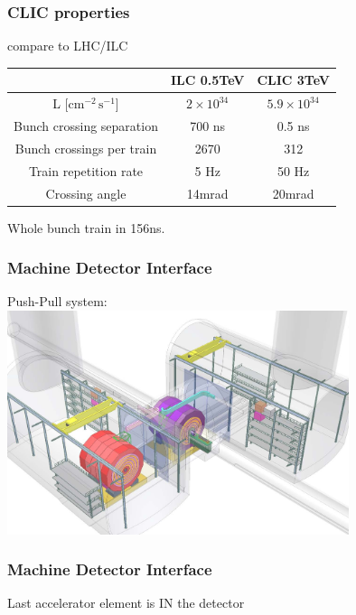 \documentclass{beamer}
\begin{document}
\begin{frame}
\frametitle{CLIC properties}
compare to LHC/ILC
\begin{center}
\begin{tabular}{ccc}
 & ILC 0.5TeV & CLIC 3TeV\\
 \midrule
L [$\textrm{cm}^{-2}\,\textrm{s}^{-1}$] & $2\times 10^{34}$&$5.9\times 10^{34}$ \\
\midrule
Bunch crossing separation  & 700 ns & \alert{0.5 ns}\\
\midrule
Bunch crossings per train & 2670 & \alert{312}\\
\midrule
Train repetition rate  & 5 Hz & 50 Hz\\
\midrule
Crossing angle & 14mrad & 20mrad\\
\bottomrule
\end{tabular}
\end{center}
\alert{Whole bunch train in 156ns.}
\end{frame}
\begin{frame}
\frametitle{Machine Detector Interface}
Push-Pull system:\\
\includegraphics[width=10cm]{PushPull.png}
\end{frame}
\begin{frame}
\frametitle{Machine Detector Interface}
\begin{center}
\alert{Last accelerator element is IN the detector}
\end{center}
\end{frame}
\end{document}
